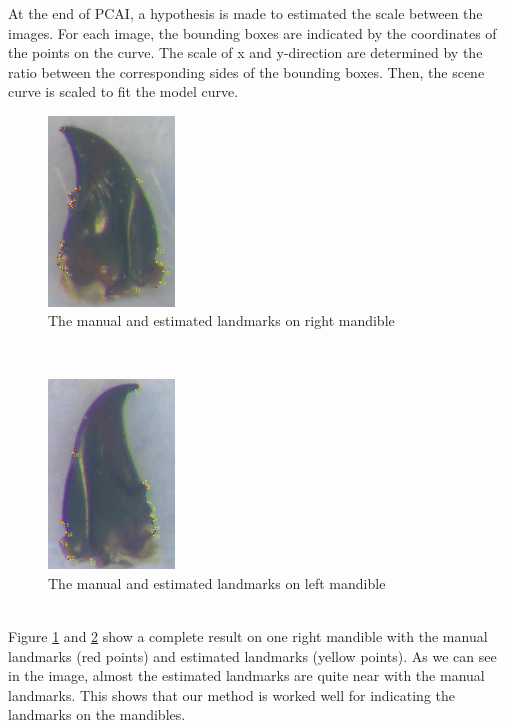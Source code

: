 \documentclass[twoside,twocolumn,10pt]{article}
\begin{document}
At the end of PCAI, a hypothesis is made to estimated the scale between the images. For each image, the bounding boxes are indicated by the coordinates of the points on the curve. The scale of x and y-direction are determined by the ratio between the corresponding sides of the bounding boxes. Then, the scene curve is scaled to fit the model curve. 
\begin{figure}[h]
\centering
\includegraphics[width=0.3\textwidth]{./images/md_rs}
\caption{The manual and estimated landmarks on right mandible}
\label{figresult}
\end{figure}~\\
\begin{figure}[h]
\centering
\includegraphics[width=0.3\textwidth]{./images/mg_rs}
\caption{The manual and estimated landmarks on left mandible}
\label{figresult2}
\end{figure}~\\
Figure \ref{figresult} and \ref{figresult2} show a complete result on one right mandible with the manual landmarks (red points) and estimated landmarks (yellow points). As we can see in the image, almost the estimated landmarks are quite near with the manual landmarks. This shows that our method is worked well for indicating the landmarks on the mandibles.\\
\end{document}
